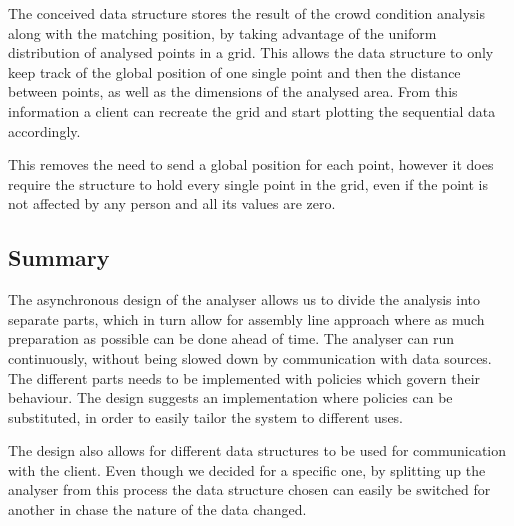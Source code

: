 The conceived data structure stores the result of the crowd condition analysis along with the matching position, by taking advantage of the uniform distribution of analysed points in a grid. This allows the data structure to only keep track of the global position of one single point and then the distance between points, as well as the dimensions of the analysed area. From this information a client can recreate the grid and start plotting the sequential data accordingly.

This removes the need to send a global position for each point, however it does require the structure to hold every single point in the grid, even if the point is not affected by any person and all its values are zero.

\subsection{Summary}
The asynchronous design of the analyser allows us to divide the analysis into separate parts, which in turn allow for assembly line approach where as much preparation as possible can be done ahead of time. The analyser can run continuously, without being slowed down by communication with data sources. The different parts needs to be implemented with policies which govern their behaviour. The design suggests an implementation where policies can be substituted, in order to easily tailor the system to different uses.

The design also allows for different data structures to be used for communication with the client. Even though we decided for a specific one, by splitting up the analyser from this process the data structure chosen can easily be switched for another in chase the nature of the data changed.